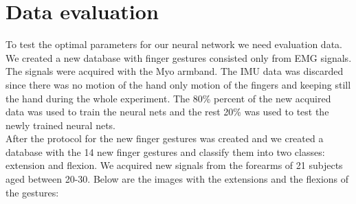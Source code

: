\section{Data evaluation}
To test the optimal parameters for our neural network we need evaluation data. We created a new database with finger gestures consisted only from EMG signals. The signals were acquired with the Myo armband. The IMU data was discarded since there was no motion of the hand only motion of the fingers and keeping still the hand during the whole experiment. The 80\% percent of the new acquired data was used to train the neural nets and the rest 20\% was used to test the newly trained neural nets.\\
After the protocol for the new finger gestures was created and we created a database with the 14 new finger gestures and classify them into two classes: extension and flexion. We acquired new signals from the forearms of 21 subjects aged between 20-30. Below are the images with the extensions and the flexions of the gestures:
